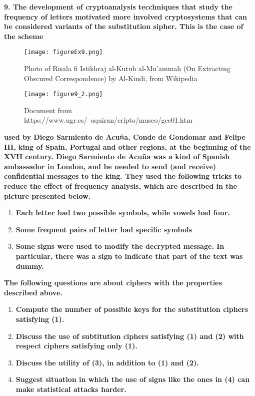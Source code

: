 \documentclass[]{article}
\numberwithin{figure}{section}
\begin{document}
\newpage
\textbf{9. The development of cryptoanalysis tecchniques that study the frequency of letters motivated more involved cryptosystems that can be considered variants of the substitution sipher. This is the case of the scheme}

\begin{figure}[h]
	\centering
	\texttt{[image: figureEx9.png]}
	\caption{Photo of Risala fi Istikhraj al-Kutub al-Mu’ammah (On Extracting Obscured Correspondence) by Al-Kindi, from Wikipedia}
\end{figure}

\begin{figure}[h]
	\centering
	\texttt{[image: figure9\_2.png]}
	\caption{ Document from https://www.ugr.es/~aquiran/cripto/museo/gce01.htm}
\end{figure}

\noindent \textbf{used by Diego Sarmiento de Acuña, Conde de Gondomar and Felipe III, king of Spain, Portugal and other regions, at the beginning of the XVII century. Diego Sarmiento de Acuña was a kind of Spanish ambassador in London, and he needed to send (and receive) confidential messages to the king. They used the following tricks to reduce the effect of frequency analysis, which are described in the picture presented below.}
\begin{enumerate}
	\item \textbf{Each letter had two possible symbols, while vowels had four.}
	\item \textbf{Some frequent pairs of letter had specific symbols}
	\item \textbf{Some signs were used to modify the decrypted message. In particular, there was a sign to indicate that part of the text was dummy.}
\end{enumerate}
\textbf{The following questions are about ciphers with the properties described above.
}
\begin{enumerate}
	\item \textbf{Compute the number of possible keys for the substitution ciphers satisfying (1).}
	\item \textbf{Discuss the use of subtitution ciphers satisfying (1) and (2) with respect ciphers satisfying only (1).}
	\item \textbf{Discuss the utility of (3), in addition to (1) and (2).}
	\item \textbf{Suggest situation in which the use of signs like the ones in (4) can make statistical attacks harder.}
\end{enumerate}
\end{document}
